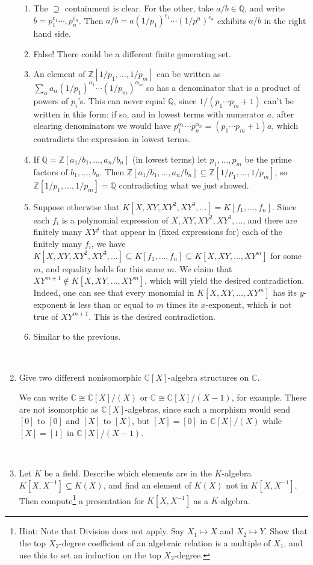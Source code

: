 \documentclass[12pt]{amsart}
\newcommand{\Q}{\mathbb{Q}}
\newcommand{\Z}{\mathbb{Z}}
\newcommand{\C}{\mathbb{C}}
\newcommand{\solution}[1]{\ifthenelse {\equal{\displaysol}{1}} {\begin{framed}{\color{meretale}\noindent #1}\end{framed}} { \ }}
\newcommand\itemB{\stepcounter{enumi}\item[(\theenumi)]}
\newcommand\itema{\stepcounter{enumii}\item[{\bf{(\theenumii)}}]}
\newcommand\itemb{\stepcounter{enumii}\item[(\theenumii)]}
\begin{document}
\begin{enumerate}
\solution{
\begin{enumerate}
\itema The $\supseteq$ containment is clear. For the other, take $a/b\in \Q$, and write $b=p_1^{e_1}\cdots,p_n^{e_n}$. Then $a/b=a(1/p_1)^{e_1}\cdots (1/p^n)^{e_n}$ exhibits $a/b$ in the right hand side.
\itema False! There could be a different finite generating set.
\itema An element of $\Z[1/p_1,\dots,1/p_m]$ can be written as $\sum_{\alpha} a_\alpha (1/p_1)^{\alpha_1} \cdots (1/p_m)^{\alpha_m}$ so has a denominator that is a product of powers of $p_i$'s. This can never equal $\Q$, since $1/(p_1 \cdots p_m +1)$ can't be written in this form: if so, and in lowest terms with numerator $a$, after clearing denominators we would have $p_1^{\alpha_1} \cdots p_n^{\alpha_n} = (p_1 \cdots p_m +1)a$, which contradicts the expression in lowest terms.
\itema If $\Q=\Z[a_1/b_1,\dots,a_n/b_n]$ (in lowest terms) let $p_1,\dots,p_m$ be the prime factors of $b_1,\dots,b_n$. Then $\Z[a_1/b_1,\dots,a_n/b_n] \subseteq \Z[1/p_1,\dots,1/p_m]$, so $\Z[1/p_1,\dots,1/p_m] = \Q$ contradicting what we just showed.
\itemb Suppose otherwise that $K[X,XY, XY^2, XY^3,\dots]=K[f_1,\dots,f_n]$. Since each $f_i$ is a polynomial expression of $X,XY, XY^2, XY^3,\dots$, and there are finitely many $XY^j$ that appear in (fixed expressions for) each of the finitely many $f_i$, we have $K[X,XY, XY^2, XY^3,\dots] \subseteq K[f_1,\dots,f_n]\subseteq K[X,XY,\dots,XY^m]$ for some $m$,  and equality holds for this same $m$. We claim that $XY^{m+1}\notin K[X,XY,\dots,XY^m]$, which will yield the desired contradiction. Indeed, one can see that every monomial in $K[X,XY,\dots,XY^m]$ has its $y$-exponent is less than or equal to $m$ times its $x$-exponent, which is not true of $XY^{m+1}$. This is the desired contradiction.
\itemb Similar to the previous.
\end{enumerate}
}

\itemB Give two different nonisomorphic $\C[X]$-algebra structures on $\C$.

\solution{We can write $\C\cong \C[X]/(X)$ or $\C \cong \C[X]/(X-1)$, for example. These are not isomorphic as $\C[X]$-algebras, since such a morphism would send $[0]$ to $[0]$ and $[X]$ to $[X]$, but $[X]=[0]$ in $\C[X]/(X)$ while $[X]=[1]$ in $\C[X]/(X-1)$.}


\itemB Let $K$ be a field. Describe which elements are in the $K$-algebra $K[X,X^{-1}]\subseteq K(X)$, and find an element of $K(X)$ not in $K[X,X^{-1}]$. Then compute\footnote{Hint: Note that Division does not apply. Say $X_1 \mapsto X$ and $X_2 \mapsto Y$. Show that the top $X_2$-degree coefficient of an algebraic relation is a multiple of $X_1$, and use this to set an induction on the top $X_2$-degree.} a presentation for $K[X,X^{-1}]$ as a $K$-algebra.


\end{enumerate}
\end{document}

